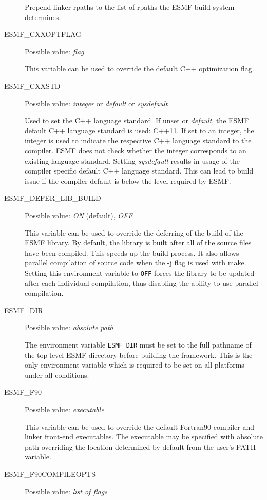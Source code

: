 \begin{description}
Prepend linker rpaths to the list of rpaths the ESMF build system determines.

\item[ESMF\_CXXOPTFLAG]
Possible value: {\em flag}

This variable can be used to override the default C++ optimization flag.

\item[ESMF\_CXXSTD]
Possible value: {\em integer} or {\em default} or {\em sysdefault}

Used to set the C++ language standard. If unset or {\em default}, the ESMF default C++ language standard is used: C++11.
If set to an integer, the integer is used to indicate the respective C++ language standard to the compiler. ESMF does not check whether the integer corresponds to an existing language standard.
Setting {\em sysdefault} results in usage of the compiler specific default C++ language standard. This can lead to build issue if the compiler default is below the level required by ESMF.

\item[ESMF\_DEFER\_LIB\_BUILD]
Possible value: {\em ON} (default), {\em OFF}

This variable can be used to override the deferring of the build of the
ESMF library.  By default, the library is built after all of the source
files have been compiled.  This speeds up the build process. It also
allows parallel compilation of source code when the -j flag is used with
make.  Setting this environment variable to {\tt OFF} forces the library to
be updated after each individual compilation, thus disabling the ability
to use parallel compilation.

\item[ESMF\_DIR]
Possible value: {\em absolute path}

The environment variable {\tt ESMF\_DIR} must be set to the full pathname
of the top level ESMF directory before building the framework. This is the
only environment variable which is required to be set on all platforms under
all conditions.

\item[ESMF\_F90]
Possible value: {\em executable}

This variable can be used to override the default Fortran90 compiler and linker
front-end executables. The executable may be specified with absolute path
overriding the location determined by default from the user's PATH variable.

\item[ESMF\_F90COMPILEOPTS]
Possible value: {\em list of flags}


\end{description}
